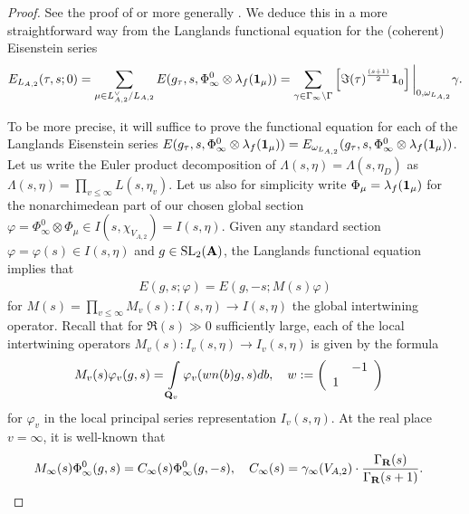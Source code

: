 \documentclass{amsart}
\theoremstyle{definition}
\begin{document}
\begin{proof} See the proof of \cite[Proposition 2.5]{BY} or more generally \cite[Theorem 3.7.2]{Bu}. 
We deduce this in a more straightforward way from the Langlands functional equation for the (coherent) Eisenstein series
\begin{align*} E_{L_{A,2}}(\tau, s; 0) 
= \sum\limits_{\mu \in L_{A,2}^{\vee} / L_{A,2}} E(g_{\tau}, s, \Phi_{\infty}^0 \otimes \lambda_f({\bf{1}}_{\mu}))
= \sum\limits_{\gamma \in \Gamma_{\infty} \backslash \Gamma} \left[ \Im(\tau)^{\frac{(s +1)}{2}} {\bf{1}}_0 \right] 
\bigg\rvert_{0, \omega_{L_{A,2}}} \gamma. \end{align*}

To be more precise, it will suffice to prove the functional equation for each of the Langlands Eisenstein series
$E(g_{\tau}, s, \Phi_{\infty}^0 \otimes \lambda_f({\bf{1}}_{\mu})) = E_{\omega_{ L_{A,2} } }(g_{\tau}, s, \Phi_{\infty}^0 \otimes \lambda_f({\bf{1}}_{\mu}))$. 
Let us write the Euler product decomposition of $\Lambda(s, \eta) = \Lambda(s, \eta_D)$ as $\Lambda(s, \eta) = \prod_{v \leq \infty} L(s, \eta_v)$.
Let us also for simplicity write $\Phi_{\mu} = \lambda_f({\bf{1}}_{\mu})$ for the nonarchimedean part of our chosen global section
$\varphi = \Phi_{\infty}^0 \otimes \Phi_{\mu} \in I(s, \chi_{V_{A, 2}}) = I(s, \eta)$.
Given any standard section $\varphi = \varphi(s) \in  I(s, \eta)$ and $g \in \operatorname{SL}_2({\bf{A}})$, the Langlands 
functional equation implies that \begin{align*} E(g, s; \varphi) = E(g, -s; M(s) \varphi) \end{align*}
for $M(s) = \prod_{v \leq \infty} M_v(s): I(s, \eta) \rightarrow I(s, \eta)$ the global intertwining operator. 
Recall that for $\Re(s) \gg 0$ sufficiently large, each of the local intertwining operators 
$M_v(s): I_v(s, \eta) \rightarrow I_v(s, \eta)$ is given by the formula 
\begin{align*} M_v(s) \varphi_v(g, s) &= \int\limits_{ {\bf{Q}}_v } \varphi_v(w n(b) g, s) db, 
\quad w := \left( \begin{array}{cc} ~ & -1 \\ 1 &  \end{array} \right) \end{align*}
for $\varphi_v$ in the local principal series representation $I_v(s, \eta)$. 
At the real place $v = \infty$, it is well-known that 
\begin{align*} M_{\infty}(s) \Phi_{\infty}^0(g, s) &= C_{\infty}(s) \Phi_{\infty}^0(g, -s), 
\quad C_{\infty}(s) = \gamma_{\infty}(V_{A, 2}) \cdot \frac{\Gamma_{\bf{R}}(s)}{\Gamma_{\bf{R}}(s+1)  }.\end{align*} 

\end{proof}
\end{document}
